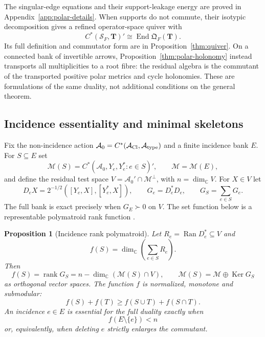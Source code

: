 \documentclass[11pt]{article}
\numberwithin{equation}{section}
\newtheorem{proposition}[theorem]{Proposition}
\theoremstyle{definition}
\theoremstyle{remark}
\newcommand{\C}{\mathbb C}
\newcommand{\rank}{\operatorname{rank}}
\newcommand{\Ker}{\operatorname{Ker}}
\newcommand{\Ran}{\operatorname{Ran}}
\newcommand{\End}{\operatorname{End}}
\newcommand{\M}{\mathcal M}
\begin{document}
The singular-edge equations and their support-leakage energy are proved in
Appendix~\ref{app:polar-details}.  When supports do not commute, their
isotypic decomposition gives a refined operator-space quiver with
\begin{equation}
 C^*(\mathcal S_F,\bm T)'\cong\End\mathfrak Q_F(\bm T).
 \label{eq:quiver-main-summary}
\end{equation}
Its full definition and commutator form are in
Proposition~\ref{thm:quiver}.  On a connected bank of invertible arrows,
Proposition~\ref{thm:polar-holonomy} instead transports all multiplicities to
a root fibre: the residual algebra is the commutant of the transported
positive polar metrics and cycle holonomies.  These are formulations of the
same duality, not additional conditions on the general theorem.


\subsection{Incidence essentiality and minimal skeletons}
\label{sec:incidence-skeleton}

Fix the non-incidence action
$\mathcal A_0=C^*(\mathcal A_{\rm Cl},\mathcal A_{\rm type})$ and a finite
incidence bank $E$.  For $S\subseteq E$ set
\[
 \M(S)=C^*(\mathcal A_0,Y_e,Y_e^*:e\in S)',
 \qquad \M=\M(E),
\]
and define the residual test space
$V=\mathcal A_0'\cap\M^\perp$, with $n=\dim_\C V$.  For $X\in V$ let
\begin{equation}
 D_eX=2^{-1/2}([Y_e,X],[Y_e^*,X]),
 \qquad G_e=D_e^*D_e,
 \qquad G_S=\sum_{e\in S}G_e.
 \label{eq:incidence-forms}
\end{equation}
The full bank is exact precisely when $G_E\succ0$ on $V$.  The set function
below is a representable polymatroid rank function \cite{Fujishige2005}.

\begin{proposition}[Incidence rank polymatroid]
\label{thm:incidence-polymatroid}
Let $R_e=\Ran D_e^*\subseteq V$ and
\begin{equation}
 f(S)=\dim_\C\!\left(\sum_{e\in S}R_e\right).
 \label{eq:incidence-rank}
\end{equation}
Then
\begin{equation}
 f(S)=\rank G_S
     =n-\dim_\C(\M(S)\cap V),
 \qquad
 \M(S)=\M\oplus\Ker G_S
 \label{eq:incidence-kernel}
\end{equation}
as orthogonal vector spaces.  The function $f$ is normalized, monotone and
submodular:
\begin{equation}
 f(S)+f(T)\ge f(S\cup T)+f(S\cap T).
 \label{eq:incidence-submodular}
\end{equation}
An incidence $e\in E$ is essential for the full duality exactly when
\begin{equation}
 f(E\setminus\{e\})<n
 \label{eq:essential-incidence}
\end{equation}
or, equivalently, when deleting $e$ strictly enlarges the commutant.
\end{proposition}
\end{document}
